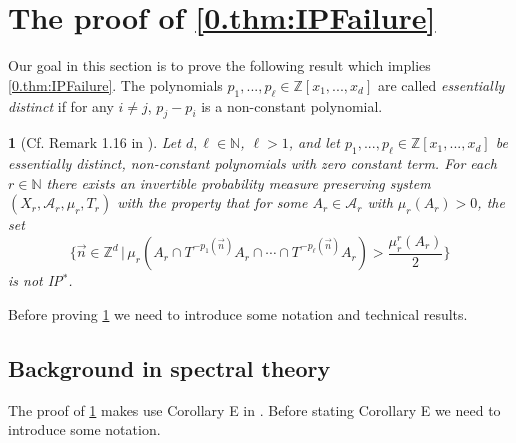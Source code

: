 \documentclass[11pt,american,preprint]{elsarticle}
\numberwithin{equation}{section}
\theoremstyle{plain}
\newtheorem{thm}{\protect\theoremname}[section]
\theoremstyle{plain*}
\theoremstyle{plain}
\theoremstyle{plain*}
\theoremstyle{plain}
\theoremstyle{plain*}
\theoremstyle{remark}
\theoremstyle{remark*}
\theoremstyle{remark}
\theoremstyle{remark*}
\theoremstyle{remark}
\theoremstyle{remark*}
\theoremstyle{plain}
\theoremstyle{definition}
\theoremstyle{plain}
\theoremstyle{plain} %
\providecommand{\theoremname}{Theorem}
\newcommand{\N}{\mathbb{N}}
\newcommand{\Z}{\mathbb{Z}}
\begin{document}
\section{The proof of \cref{0.thm:IPFailure}}\label{Sec8}
Our goal in this section is to prove the following result which implies   \cref{0.thm:IPFailure}. The  polynomials $p_1,...,p_\ell\in\Z[x_1,...,x_d]$ are called \textit{essentially distinct} if for any $i\neq j$, $p_j-p_i$ is a non-constant polynomial. 
\begin{thm}[Cf. Remark 1.16 in \cite{zelada2025coexistence}]\label{6.thm:FailureOfIP*Part2}
Let $d,\ell\in\N$, $\ell>1$, and let $p_1,...,p_\ell\in\Z[x_1,...,x_d]$ be essentially distinct, non-constant polynomials with zero constant term. For each $r\in\N$ there exists an invertible probability  measure preserving system $(X_r,\mathcal A_r,\mu_r,T_r)$  with the property that for some $A_r\in\mathcal A_r$ with $\mu_r(A_r)>0$, the set 
$$
\{\vec n\in\Z^d\,|\,\mu_r(A_r\cap T^{-p_1(\vec n)}A_r\cap \cdots\cap T^{-p_\ell(\vec n)}A_r)>\frac{\mu_r^r(A_r)}{2}\}
$$
is not \rm{IP$^*$}. 
\end{thm}
Before proving   \cref{6.thm:FailureOfIP*Part2} we need to introduce some notation and technical results.
 \subsection{Background in spectral theory}
The proof of \cref{6.thm:FailureOfIP*Part2} makes use  Corollary E  in \cite{BKLUltrafilterPoly}. Before stating Corollary E  we need to introduce some notation.\\
\end{document}
